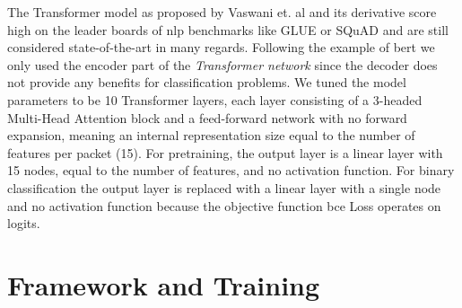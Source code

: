 
The Transformer model as proposed by Vaswani et. al \cite{attention} and its derivative score high on the leader boards of \gls{nlp} benchmarks like GLUE \cite{glue} or SQuAD \cite{bibid} and are still considered state-of-the-art in many regards. Following the example of \gls{bert} we only used the encoder part of the \textit{Transformer network} since the decoder does not provide any benefits for classification problems. We tuned the model parameters to be 10 Transformer layers, each layer consisting of a 3-headed Multi-Head Attention block and a feed-forward network with no forward expansion, meaning an internal representation size equal to the number of features per packet (15). For pretraining, the output layer is a linear layer with 15 nodes, equal to the number of features, and no activation function. For binary classification the output layer is replaced with a linear layer with a single node and no activation function because the objective function \gls{bce} Loss operates on logits.


\section{Framework and Training}

